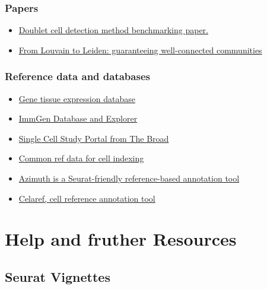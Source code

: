 \documentclass[
]{book}
\providecommand{\tightlist}{%
  \setlength{\itemsep}{0pt}\setlength{\parskip}{0pt}}
\begin{document}
\hypertarget{papers}{%
\subsubsection{Papers}\label{papers}}

\begin{itemize}
\tightlist
\item
  \href{https://www.cell.com/cell-systems/fulltext/S2405-4712(20)30459-2}{Doublet cell detection method benchmarking paper.}
\item
  \href{https://www.nature.com/articles/s41598-019-41695-z}{From Louvain to Leiden: guaranteeing well-connected communities}
\end{itemize}

\hypertarget{reference-data-and-databases}{%
\subsubsection{Reference data and databases}\label{reference-data-and-databases}}

\begin{itemize}
\tightlist
\item
  \href{https://gtexportal.org/home/}{Gene tissue expression database}
\item
  \href{https://www.immgen.org/Databrowser19/DatabrowserPage.html}{ImmGen Database and Explorer}
\item
  \href{https://singlecell.broadinstitute.org/single_cell}{Single Cell Study Portal from The Broad}
\item
  \href{http://bioconductor.org/packages/release/data/experiment/vignettes/celldex/inst/doc/userguide.html\#2_General-purpose_references}{Common ref data for cell indexing}
\item
  \href{https://azimuth.hubmapconsortium.org/references/\#Human\%20-\%20PBMC}{Azimuth is a Seurat-friendly reference-based annotation tool}
\item
  \href{https://www.bioconductor.org/packages/release/bioc/html/celaref.html}{Celaref, cell reference annotation tool}
\end{itemize}

\hypertarget{help-and-fruther-resources}{%
\section{Help and fruther Resources}\label{help-and-fruther-resources}}

\hypertarget{seurat-vignettes}{%
\subsection*{Seurat Vignettes}\label{seurat-vignettes}}
\end{document}
